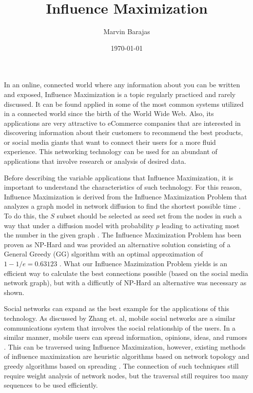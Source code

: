 \documentclass[12pt]{article}
\title{Influence Maximization}
\author{Marvin Barajas}
\date{\today}				%
\begin{document}
\linespread{1.3}			%
\maketitle				%
\pagebreak
In an online, connected world where any information about you can be written and exposed, Influence Maximization is a topic regularly practiced and rarely discussed. 
It can be found applied in some of the most common systems utilized in a connected world since the birth of the World Wide Web. 
Also, its applications are very attractive to eCommerce companies that are interested in discovering information about their customers to recommend the best products, or social media giants that want to connect their users for a more fluid experience. 
This networking technology can be used for an abundant of applications that involve research or analysis of desired data. 

Before describing the variable applications that Influence Maximization, it is important to understand the characteristics of such technology. 
For this reason, Influence Maximization is derived from the Influence Maximization Problem that analyzes a graph model in network diffusion to find the shortest possible time \cite{9721514}. 
To do this, the $S$ subset should be selected as seed set from the nodes in such a way that under a diffusion model with probability $p$ leading to activating most the number in the given graph \cite{9721514}. 
The Influence Maximization Problem has been proven as NP-Hard and was provided an alternative solution consisting of a  General Greedy (GG) slgorithm with an optimal approximation of $1-1/e=0.63123$ \cite{9721514}. 
What our Influence Mazimization Problem yields is an efficient way to calculate the best connections possible (based on the social media network graph), but with a difficutly of NP-Hard an alternative was necessary as shown. 

Social networks can expand as the best example for the applications of this technology. As discussed by Zhang et. al, mobile social networks are a similar communications system that involves the social relationship of the users. 
In a similar manner, mobile users can spread information, opinions, ideas, and rumors \cite{9744500}. 
This can be traversed using Influence Maximization, however, existing methods of influence maximization are heuristic algorithms based on network topology and greedy algorithms based on spreading \cite{9744500}. 
The connection of such techniques still require weight analysis of network nodes, but the traversal still requires too many sequences to be used efficiently.
\end{document}

